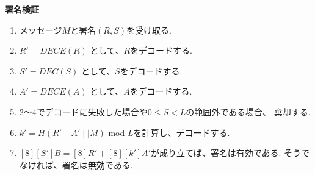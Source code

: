 \begin{mdframed}[linecolor=black,roundcorner=10pt]
  \textbf{署名検証}
  \begin{enumerate}[parsep=7pt]
    \item メッセージ$M$と署名$(R,S)$を受け取る.
    \item $R'=DECE(R)$ として、$R$をデコードする.
    \item $S'=DEC(S)$ として、$S$をデコードする.
    \item $A'=DECE(A)$ として、$A$をデコードする.
    \item 2～4でデコードに失敗した場合や$0\leq S<L$の範囲外である場合、
    棄却する.
    \item $k'=H(R' \mid\mid A' \mid\mid M)$ mod $L$を計算し、デコードする.
    \item $[8][S']B=[8]R'+[8][k']A'$が成り立てば、署名は有効である.
    そうでなければ、署名は無効である.
  \end{enumerate}
\end{mdframed}


